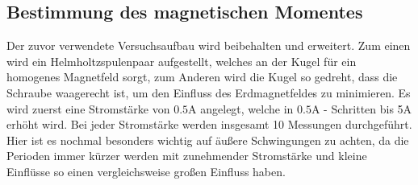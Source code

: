 \subsection{Bestimmung des magnetischen Momentes} 
    Der zuvor verwendete Versuchsaufbau wird beibehalten und erweitert. Zum einen wird ein Helmholtzspulenpaar aufgestellt, welches
    an der Kugel für ein homogenes Magnetfeld sorgt, zum Anderen wird die Kugel so gedreht, dass die Schraube waagerecht ist, um
    den Einfluss des Erdmagnetfeldes zu minimieren. 
    Es wird zuerst eine Stromstärke von $0.5$A angelegt, welche in $0.5$A - Schritten bis 5A erhöht wird. Bei jeder Stromstärke
    werden insgesamt 10 Messungen durchgeführt. Hier ist es nochmal besonders wichtig auf äußere Schwingungen zu achten, da die
    Perioden immer kürzer werden mit zunehmender Stromstärke und kleine Einflüsse so einen vergleichsweise großen Einfluss haben.
